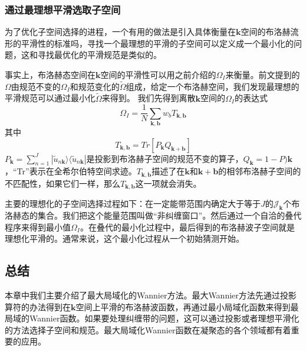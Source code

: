 \subsubsection{通过最理想平滑选取子空间}
为了优化子空间选择的进程，一个有用的做法是引入具体衡量在$\bm{k}$空间的布洛赫流形的平滑性的标准吗，寻找一个最理想的平滑的子空间可以定义成一个最小化的问题，这和寻找最优化的平滑规范是类似的。

事实上，布洛赫态空间在$\bm{k}$空间的平滑性可以用之前介绍的$\Omega_I$来衡量。前文提到的$\Omega$由规范不变的$\Omega_I$和规范变化的$\widetilde \Omega$组成，给定一个布洛赫空间，我们发现最理想的平滑规范可以通过最小化$\widetilde \Omega$来得到。
我们先得到离散$\bm{k}$空间的$\Omega_I$的表达式
\begin{equation}
\Omega_I=\frac{1}{N}\sum_{\bm{k},\bm{b}}w_bT_{\bm{k},\bm{b}}
\end{equation}
其中
\begin{equation}
T_{\bm{k},\bm{b}}=Tr[P_{\bm{k}}Q_{\bm{k+b}}]
\end{equation}
$P_{\bm{k}}=\sum_{n=1}^{J}|\widetilde u_{n \bm{k}}\rangle \langle\widetilde u_{n \bm{k}}|$是投影到布洛赫子空间的规范不变的算子，$Q_{\bm{k}}=1-P){\bm{k}}$，“Tr”表示在全希尔伯特空间求迹。$T_{\bm{k},\bm{b}}$描述了在$\bm{k}$和$\bm{k+b}$的相邻布洛赫子空间的不匹配性，如果它们一样，那么$T_{\bm{k},\bm{b}}$这一项就会消失。

主要的理想化的子空间选择过程如下：在一定能带范围内确定大于等于$J$的$\mathcal{J}_{\bm{k}}$个布洛赫态的集合。我们把这个能量范围叫做“非纠缠窗口”。然后通过一个自洽的叠代程序来得到最小值$\Omega_I$。在叠代的最小化过程中，最后得到的布洛赫波子空间就是理想化平滑的。通常来说，这个最小化过程从一个初始猜测开始。

\subsection{总结}
本章中我们主要介绍了最大局域化的Wannier方法。最大Wannier方法先通过投影算符的办法得到在$\bm{k}$空间上平滑的布洛赫波函数，再通过最小局域化函数来得到最局域的Wannier函数。如果要处理纠缠带的问题，这可以通过投影或者理想平滑化的方法选择子空间和规范。最大局域化Wannier函数在凝聚态的各个领域都有着重要的应用。